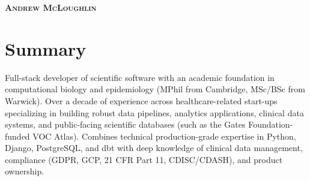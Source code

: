 \documentclass[letterpaper,11pt]{article}
\begin{document}
\begin{center}
    \textbf{\Huge \scshape Andrew McLoughlin}
\end{center}

\section{Summary}
Full-stack developer of scientific software with an academic foundation in computational biology and epidemiology (MPhil from Cambridge, MSc/BSc from Warwick). Over a decade of experience across healthcare-related start-ups specializing in building robust data pipelines, analytics applications, clinical data systems, and public-facing scientific databases (such as the Gates Foundation-funded VOC Atlas). Combines technical production-grade expertise in Python, Django, PostgreSQL, and dbt with deep knowledge of clinical data management, compliance (GDPR, GCP, 21 CFR Part 11, CDISC/CDASH), and product ownership.

\end{document}
